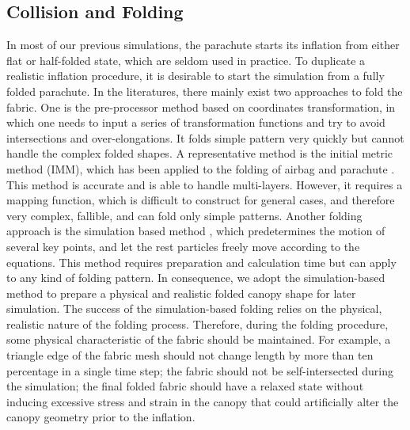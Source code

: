 \subsection{Collision and Folding}
In most of our previous simulations, the parachute starts its inflation from either flat or half-folded state, which are seldom used in practice. To duplicate a realistic inflation procedure, it is desirable to start the simulation from a fully folded parachute. In the literatures, there mainly exist two approaches to fold the fabric. One is the pre-processor method based on coordinates transformation, in which one needs to input a series of transformation functions and try to avoid intersections and over-elongations. It folds simple pattern very quickly but cannot handle the complex folded shapes. A representative method is the initial metric method (IMM), which has been applied to the folding of airbag \cite{Tanavde1995Airbag, Zhang2005Airbag} and parachute \cite{Zhan2014Initial}. This method is accurate and is able to handle multi-layers. However, it requires a mapping function, which is difficult to construct for general cases, and therefore very complex, fallible, and can fold only simple patterns. Another folding approach is the simulation based method \cite{Hayashi2013Jfold, Hayashi2014Jfold, Taylor2015Using}, which predetermines the motion of several key points, and let the rest particles freely move according to the equations. This method requires preparation and calculation time but can apply to any kind of folding pattern. In consequence, we adopt the simulation-based method to prepare a physical and realistic folded canopy shape for later simulation. The success of the simulation-based folding relies on the physical, realistic nature of the folding process. Therefore, during the folding procedure, some physical characteristic of the fabric should be maintained. For example, a triangle edge of the fabric mesh should not change length by more than ten percentage in a single time step\cite{Caramana1999Construction}; the fabric should not be self-intersected during the simulation\cite{Bridson2005Robust}; the final folded fabric should have a relaxed state without inducing excessive stress and strain in the canopy that could artificially alter the canopy geometry prior to the inflation\cite{Tutt2011Finite}.

